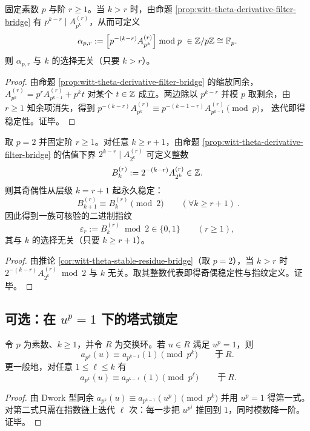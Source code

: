 \begin{corollary}\label{cor:witt-theta-stable-residue-bridge}
固定素数 \(p\) 与阶 \(r\ge 1\)。当 \(k>r\) 时，由命题 \ref{prop:witt-theta-derivative-filter-bridge} 有 \(p^{k-r}\mid A_{p^k}^{(r)}\)，从而可定义
$$
\alpha_{p,r}:=\left[p^{-(k-r)}A_{p^k}^{(r)}\right]\bmod p\ \in \mathbb{Z}/p\mathbb{Z}\cong\mathbb{F}_p.
$$
则 \(\alpha_{p,r}\) 与 \(k\) 的选择无关（只要 \(k>r\)）。
\end{corollary}
\begin{proof}
由命题 \ref{prop:witt-theta-derivative-filter-bridge} 的缩放同余，
$
A_{p^k}^{(r)}=p^rA_{p^{k-1}}^{(r)}+p^k t
$
对某个 \(t\in\mathbb{Z}\) 成立。两边除以 \(p^{k-r}\) 并模 \(p\) 取剩余，由 \(r\ge 1\) 知余项消失，得到
$
p^{-(k-r)}A_{p^k}^{(r)}\equiv p^{-(k-1-r)}A_{p^{k-1}}^{(r)}\pmod p
$，
迭代即得稳定性。证毕。
\end{proof}

\begin{corollary}[\texorpdfstring{$p=2$}{p=2} 的稳定奇偶指纹：由 \texorpdfstring{$\theta$}{theta}-导数生成一族无限二进制不变量]\label{cor:witt-theta-binary-fingerprint-bridge}
取 \(p=2\) 并固定阶 \(r\ge 1\)。对任意 \(k\ge r+1\)，由命题 \ref{prop:witt-theta-derivative-filter-bridge} 的估值下界 \(2^{k-r}\mid A_{2^k}^{(r)}\) 可定义整数
$$
B_k^{(r)}:=2^{-(k-r)}A_{2^k}^{(r)}\in\mathbb{Z}.
$$
则其奇偶性从层级 \(k=r+1\) 起永久稳定：
$$
\boxed{\ B_{k+1}^{(r)}\equiv B_{k}^{(r)}\pmod 2\qquad(\forall k\ge r+1)\ }.
$$
因此得到一族可核验的二进制指纹
$$
\varepsilon_r:=B_{k}^{(r)}\bmod 2\in\{0,1\}\qquad(r\ge 1),
$$
其与 \(k\) 的选择无关（只要 \(k\ge r+1\)）。
\end{corollary}
\begin{proof}
由推论 \ref{cor:witt-theta-stable-residue-bridge}（取 \(p=2\)），当 \(k>r\) 时
$
2^{-(k-r)}A_{2^k}^{(r)}\bmod 2
$
与 \(k\) 无关。取其整数代表即得奇偶稳定性与指纹定义。证毕。
\end{proof}

\subsection{可选：在 \texorpdfstring{$u^p=1$}{u^p=1} 下的塔式锁定}\label{subsec:root-of-unity-lock}

\begin{corollary}[\texorpdfstring{$u^p=1$}{u^p=1} 的塔式锁定：扭曲迹被推回无扭曲层]\label{cor:witt-root-of-unity-tower-lock-bridge}
令 \(p\) 为素数、\(k\ge 1\)，并令 \(R\) 为交换环。若 \(u\in R\) 满足 \(u^p=1\)，则
$$
a_{p^k}(u)\equiv a_{p^{k-1}}(1)\pmod{p^k}\qquad\text{于}\ R.
$$
更一般地，对任意 \(1\le \ell\le k\) 有
$$
\boxed{\ a_{p^k}(u)\equiv a_{p^{k-\ell}}(1)\pmod{p^\ell}\ }\qquad\text{于}\ R.
$$
\end{corollary}
\begin{proof}
由 Dwork 型同余
$
a_{p^k}(u)\equiv a_{p^{k-1}}(u^p)\pmod{p^k}
$
并用 \(u^p=1\) 得第一式。
对第二式只需在指数链上迭代 \(\ell\) 次：每一步把 \(u^{p^j}\) 推回到 \(1\)，同时模数降一阶。证毕。
\end{proof}

